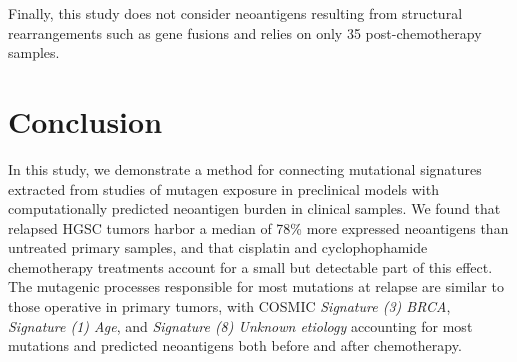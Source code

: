 \documentclass{bmcart}
\begin{document}
Finally, this study does not consider neoantigens resulting from structural rearrangements such as gene fusions and relies on only 35 post-chemotherapy samples.


\section*{Conclusion}
In this study, we demonstrate a method for connecting mutational signatures extracted from studies of mutagen exposure in preclinical models with computationally predicted neoantigen burden in clinical samples. We found that relapsed HGSC tumors harbor a median of 78\% more expressed neoantigens than untreated primary samples, and that cisplatin and cyclophophamide chemotherapy treatments account for a small but detectable part of this effect. The mutagenic processes responsible for most mutations at relapse are similar to those operative in primary tumors, with COSMIC \textit{Signature (3) BRCA}, \textit{Signature (1) Age}, and \textit{Signature (8) Unknown etiology} accounting for most mutations and predicted neoantigens both before and after chemotherapy.


\end{document}
